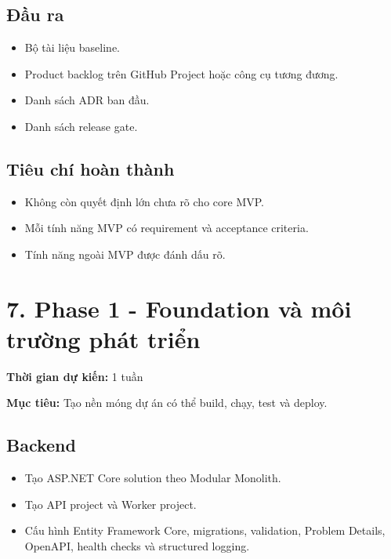 \documentclass[
  11pt,
  a4paper,
]{article}
\begin{document}
\subsection{Đầu ra}\label{ux111ux1ea7u-ra}

\begin{itemize}
\item
  Bộ tài liệu baseline.
\item
  Product backlog trên GitHub Project hoặc công cụ tương đương.
\item
  Danh sách ADR ban đầu.
\item
  Danh sách release gate.
\end{itemize}

\subsection{Tiêu chí hoàn thành}\label{tiuxeau-chuxed-houxe0n-thuxe0nh}

\begin{itemize}
\item
  Không còn quyết định lớn chưa rõ cho core MVP.
\item
  Mỗi tính năng MVP có requirement và acceptance criteria.
\item
  Tính năng ngoài MVP được đánh dấu rõ.
\end{itemize}

\section{7. Phase 1 - Foundation và môi trường phát
triển}\label{phase-1---foundation-vuxe0-muxf4i-trux1b0ux1eddng-phuxe1t-triux1ec3n}

\textbf{Thời gian dự kiến:} 1 tuần

\textbf{Mục tiêu:} Tạo nền móng dự án có thể build, chạy, test và
deploy.

\subsection{Backend}\label{backend}

\begin{itemize}
\item
  Tạo ASP.NET Core solution theo Modular Monolith.
\item
  Tạo API project và Worker project.
\item
  Cấu hình Entity Framework Core, migrations, validation, Problem
  Details, OpenAPI, health checks và structured logging.
\end{itemize}
\end{document}
